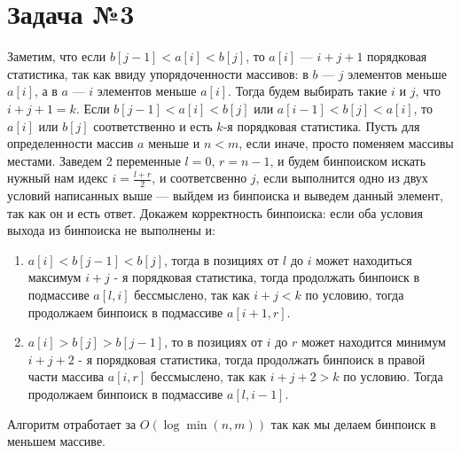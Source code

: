 \documentclass{article}
\begin{document}
\section{Задача №3}
Заметим, что если $b[j-1]<a[i]<b[j]$, то $a[i]$ --- $i+j+1$ порядковая статистика, так как ввиду упорядоченности массивов: в $b$ --- $j$ элементов меньше $a[i]$, а в $a$ --- $i$ элементов меньше $a[i]$. Тогда будем выбирать такие $i$ и $j$, что $i+j+1=k$.\newline
Если $b[j-1]<a[i]<b[j]$ или $a[i-1]<b[j]<a[i]$, то $a[i]$ или $b[j]$ соответственно и есть $k$-я порядковая статистика. Пусть для определенности массив $a$ меньше и $n<m$, если иначе, просто поменяем массивы местами.\newline
Заведем 2 переменные $l=0$, $r=n-1$, и будем бинпоиском искать нужный нам идекс $i=\frac{l+r}{2}$, и соответсвенно $j$, если выполнится одно из двух условий написанных выше --- выйдем из бинпоиска и выведем данный элемент, так как он и есть ответ. Докажем корректность бинпоиска: если оба условия выхода из бинпоиска не выполнены и:  
\begin{enumerate}
\item
$a[i]<b[j-1]<b[j]$, тогда в позициях от $l$ до $i$ может находиться максимум $i+j$ - я порядковая статистика, тогда продолжать бинпоиск в подмассиве $a[l,i]$ бессмыслено, так как $i+j<k$ по условию, тогда продолжаем бинпоиск в подмассиве $a[i+1,r]$. 
\item
$a[i]>b[j]>b[j-1]$, то в позициях от $i$ до $r$ может находится минимум $i+j+2$ - я порядковая статистика, тогда продолжать бинпоиск в правой части массива $a[i,r]$ бессмыслено, так как $i+j+2>k$ по условию. Тогда продолжаем бинпоиск в подмассиве $a[l,i-1]$. 
\end{enumerate}
Алгоритм отработает за $O(\log\min(n, m))$ так как мы делаем бинпоиск в меньшем массиве.
\end{document}
